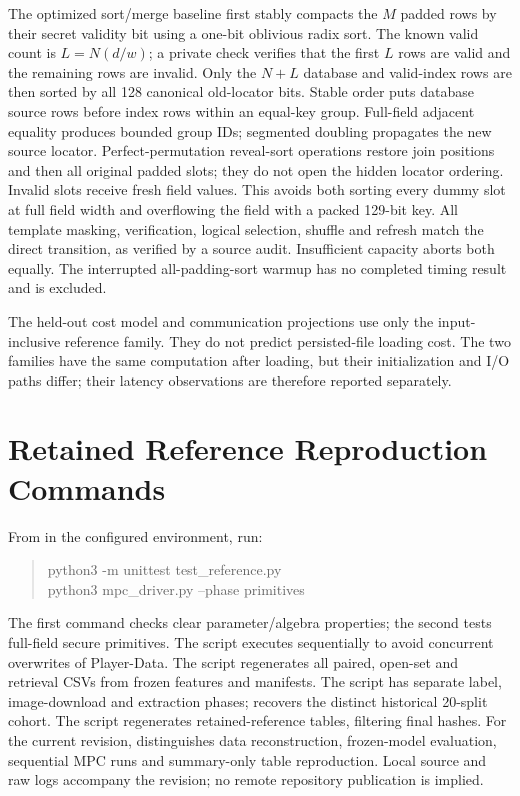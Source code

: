 \documentclass[journal,onecolumn]{IEEEtran}
\begin{document}
The optimized sort/merge baseline first stably compacts the $M$ padded rows by their secret validity bit using a one-bit oblivious radix sort. The known valid count is $L=N(d/w)$; a private check verifies that the first $L$ rows are valid and the remaining rows are invalid. Only the $N+L$ database and valid-index rows are then sorted by all 128 canonical old-locator bits. Stable order puts database source rows before index rows within an equal-key group. Full-field adjacent equality produces bounded group IDs; segmented doubling propagates the new source locator. Perfect-permutation reveal-sort operations restore join positions and then all original padded slots; they do not open the hidden locator ordering. Invalid slots receive fresh field values. This avoids both sorting every dummy slot at full field width and overflowing the field with a packed 129-bit key. All template masking, verification, logical selection, shuffle and refresh match the direct transition, as verified by a source audit. Insufficient capacity aborts both equally. The interrupted all-padding-sort warmup has no completed timing result and is excluded.

The held-out cost model and communication projections use only the input-inclusive reference family. They do not predict persisted-file loading cost. The two families have the same computation after loading, but their initialization and I/O paths differ; their latency observations are therefore reported separately.



\section{Retained Reference Reproduction Commands}
From  in the configured environment, run:
\begin{quote}\ttfamily
python3 -m unittest test\_reference.py\\
python3 mpc\_driver.py --phase primitives
\end{quote}
The first command checks clear parameter/algebra properties; the second tests full-field secure primitives. The script  executes sequentially to avoid concurrent overwrites of Player-Data. The script  regenerates all paired, open-set and retrieval CSVs from frozen features and manifests. The script  has separate label, image-download and extraction phases;  recovers the distinct historical 20-split cohort. The script  regenerates retained-reference tables, filtering final hashes. For the current revision,  distinguishes data reconstruction, frozen-model evaluation, sequential MPC runs and summary-only table reproduction. Local source and raw logs accompany the revision; no remote repository publication is implied.



\end{document}
